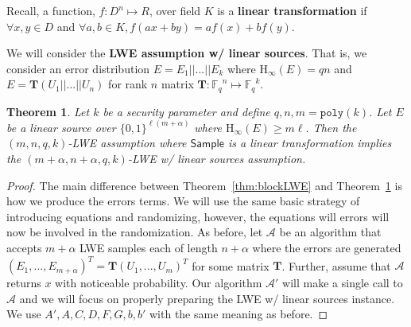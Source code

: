 \documentclass[11pt]{article}
\newcommand{\thref}[1]{\mbox{Theorem~\ref{#1}}}
\newcommand{\class}[1]{{\ensuremath{\mathsf{#1}}}}
\newcommand{\Fq}{\ensuremath{\mathbb{F}_q}}
\newcommand{\sample}{\ensuremath{\class{Sample}}\xspace}
\newcommand{\poly}{\ensuremath{\mathtt{poly}}\xspace}
\newcommand{\Hoo}{\mathrm{H}_\infty}
\newtheorem{theorem}{Theorem}[section]
\begin{document}
{Recall, a function, $f:D^n \mapsto R$, over field $K$ is a \textbf{linear transformation} if $\forall x,y\in D$ and $\forall a, b\in K, f(ax+by) = af(x) + bf(y)$.

We will consider the \textbf{LWE assumption w/ linear sources}.  That is, we consider an error distribution $E = E_1||...||E_k$ where $\Hoo(E) = qn$ and $E = \mathbf{T}(U_1||...||U_n)$ for rank $n$ matrix $\mathbf{T}: \Fq^n\mapsto \Fq^k$.
\vspace{.1in}
\begin{theorem}\label{thm:linearLWE}
Let $k$ be a security parameter and define $q, n, m = \poly(k)$.  Let $E$ be a linear source over $\{0,1\}^{\ell(m+\alpha)}$ where $\Hoo(E) \geq m\ell$.  Then the $(m,n,q,k)$-LWE assumption where \sample is a linear transformation implies the $(m+\alpha, n+\alpha, q, k)$-LWE w/ linear sources assumption.
\end{theorem}
\begin{proof}
The main difference between \thref{thm:blockLWE} and \thref{thm:linearLWE} is how we produce the errors terms.  We will use the same basic strategy of introducing equations and randomizing, however, the equations will errors will now be involved in the randomization.  As before, let $\mathcal{A}$ be an algorithm that accepts $m+\alpha$ LWE samples each of length $n+\alpha$ where the errors are generated $(E_1,..., E_{m+\alpha})^T = \mathbf{T} (U_1,..., U_m)^T$ for some matrix $\mathbf{T}$.  Further, assume that $\mathcal{A}$ returns $x$ with noticeable probability.  Our algorithm $\mathcal{A'}$ will make a single call to $\mathcal{A}$ and we will focus on properly preparing the LWE w/ linear sources instance.  We use $A',A,C,D,F,G,b,b'$ with the same meaning as before.
\end{proof}
}
\end{document}
